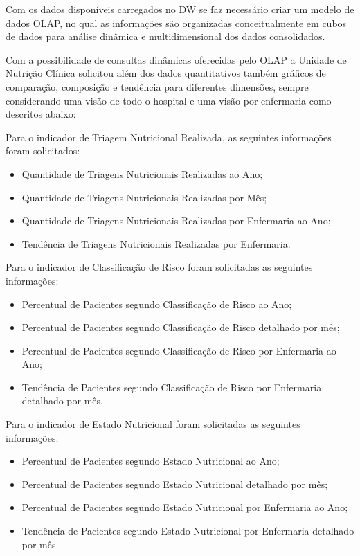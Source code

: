 Com os dados disponíveis carregados no DW se faz necessário criar um modelo de dados OLAP, no qual as informações são organizadas conceitualmente em cubos de dados para análise dinâmica e multidimensional dos dados consolidados.

Com a possibilidade de consultas dinâmicas oferecidas pelo OLAP a Unidade de Nutrição Clínica solicitou além dos dados quantitativos também gráficos de comparação, composição e tendência para diferentes dimensões, sempre considerando uma visão de todo o hospital e uma visão por enfermaria como descritos abaixo: 

Para o indicador de Triagem Nutricional Realizada, as seguintes informações foram solicitados:
\begin{itemize}
    \item Quantidade de Triagens Nutricionais Realizadas ao Ano;
    \item Quantidade de Triagens Nutricionais Realizadas por Mês;
    \item Quantidade de Triagens Nutricionais Realizadas por Enfermaria ao Ano;
    \item Tendência de Triagens Nutricionais Realizadas por Enfermaria.
\end{itemize}

Para o indicador de Classificação de Risco foram solicitadas as seguintes informações:
\begin{itemize}
    \item Percentual de Pacientes segundo Classificação de Risco ao Ano;
    \item Percentual de Pacientes segundo Classificação de Risco detalhado por mês;
    \item Percentual de Pacientes segundo Classificação de Risco por Enfermaria ao Ano;
    \item Tendência de Pacientes segundo Classificação de Risco por Enfermaria detalhado por mês.
\end{itemize}

Para o indicador de Estado Nutricional foram solicitadas as seguintes informações:
\begin{itemize}
    \item Percentual de Pacientes segundo Estado Nutricional ao Ano;
    \item Percentual de Pacientes segundo Estado Nutricional detalhado por mês;
    \item Percentual de Pacientes segundo Estado Nutricional por Enfermaria ao Ano;
    \item Tendência de Pacientes segundo Estado Nutricional por Enfermaria detalhado por mês.
\end{itemize}

